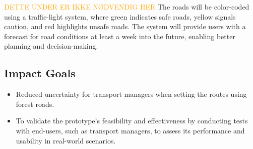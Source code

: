 \textcolor{orange}{DETTE UNDER ER IKKE NØDVENDIG HER}
The roads will be color-coded using a traffic-light system, where green indicates safe roads, yellow signals caution, and red highlights unsafe roads. The system will provide users with a forecast for road conditions at least a week into the future, enabling better planning and decision-making. 

\subsection{Impact Goals}\label{subsec:req:impactgoals}
\begin{itemize}
    \item Reduced uncertainty for transport managers when setting the routes using forest roads.
    \item To validate the prototype's feasibility and effectiveness by conducting tests with end-users, such as transport managers, to assess its performance and usability in real-world scenarios.
\end{itemize}

